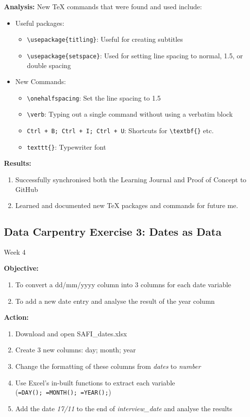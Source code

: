 \documentclass{article}
\begin{document}
\textbf{Analysis:} New TeX commands that were found and used include:
    \begin{itemize}
        \item Useful packages:
        \begin{itemize}
            \item \verb|\usepackage{titling}|: Useful for creating subtitles
            \item \verb|\usepackage{setspace}|: Used for setting line spacing to normal, 1.5, or double spacing
        \end{itemize}
        \item New Commands:
        \begin{itemize}
            \item \verb|\onehalfspacing|: Set the line spacing to 1.5
            \item \verb|\verb|: Typing out a single command without using a verbatim block
            \item \texttt{Ctrl + B; Ctrl + I; Ctrl + U}: Shortcuts for \verb|\textbf{}| etc.
            \item \verb|texttt{}|: Typewriter font
        \end{itemize}
    \end{itemize}
\textbf{Results:}
\begin{enumerate}
    \item Successfully synchronised both the Learning Journal and Proof of Concept to GitHub
    \item Learned and documented new TeX packages and commands for future me.
\end{enumerate}
\newpage
\begin{center}
\section{Data Carpentry Exercise 3: Dates as Data}
Week 4
\end{center}
\textbf{Objective:}
\begin{enumerate}
    \item To convert a dd/mm/yyyy column into 3 columns for each date variable
    \item To add a new date entry and analyse the result of the year column
\end{enumerate}
\textbf{Action:}
\begin{enumerate}
    \item Download and open SAFI\_dates.xlsx
    \item Create 3 new columns: day; month; year
    \item Change the formatting of these columns from \textit{dates} to \textit{number}
    \item Use Excel's in-built functions to extract each variable\\ (\verb|=DAY(); =MONTH(); =YEAR();|)
    \item Add the date \textit{17/11} to the end of \textit{interview\_date} and analyse the results
\end{enumerate}
\end{document}

